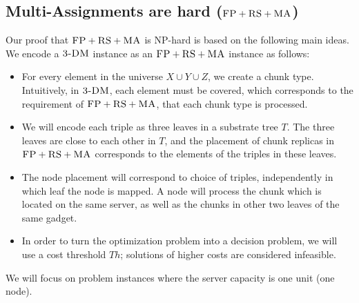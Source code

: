 \documentclass[9pt]{sigcomm-alternate}
\newcommand{\FP}{\textsc{FP}}
\newcommand{\RS}{\textsc{RS}}
\newcommand{\MA}{\textsc{MA}}
\newcommand{\Tree}{\ensuremath{T}}
\newcommand{\TDM}{\textsc{3-DM}}
\newcommand{\Thr}{\ensuremath{Th}}
\begin{document}

\subsection{Multi-Assignments are hard ($\FP+\RS+\MA$)}\label{ssec:fprsma}

Our proof that $\FP+\RS+\MA$ is NP-hard is based on the following main ideas.
We encode a $\TDM$ instance as an $\FP+\RS+\MA$ instance as follows:

 \begin{itemize}
 \item For every element in the universe $X\cup Y\cup
 Z$, we create a chunk type. Intuitively, in $\TDM$,
 each element must be covered, which corresponds to the requirement
 of $\FP+\RS+\MA$,
 that each chunk type is processed.

 \item We will encode each triple as three leaves in
 a substrate tree $\Tree$. The three leaves are close to each
 other in $\Tree$, and the placement of chunk replicas in $\FP+\RS+\MA$
 corresponds to the elements of the
 triples in these leaves.

 \item The node placement will correspond to choice of triples,
 independently in which leaf the node is mapped.
 A node will process the chunk which is located on the same server,
 as well as the chunks in other two leaves of the same gadget.

\item In order to turn the optimization problem into a decision problem, we will use
a cost threshold $\Thr$; solutions of higher costs are considered infeasible.
\end{itemize}

We will focus on problem instances where the server capacity is one unit (one node).
\end{document}
